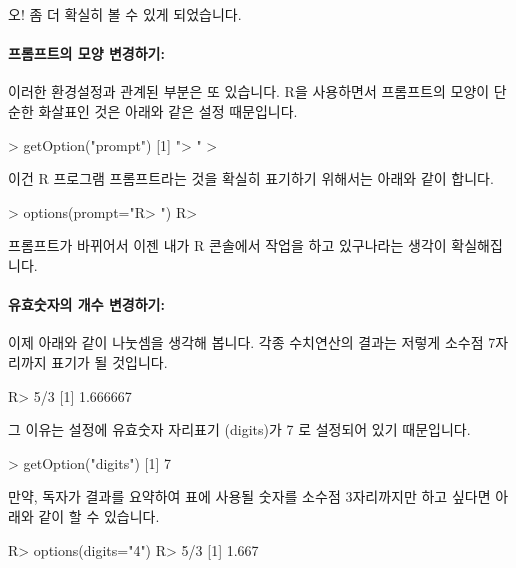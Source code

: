 오! 좀 더 확실히 볼 수 있게 되었습니다. 

\paragraph{프롬프트의 모양 변경하기:}  이러한 환경설정과 관계된 부분은 또 있습니다. 
R을 사용하면서 프롬프트의 모양이 단순한 화살표인 것은 아래와 같은 설정 때문입니다.

\begin{Schunk}
\begin{Soutput}
> getOption("prompt")
[1] "> "
> 
\end{Soutput}
\end{Schunk}

이건 R 프로그램 프롬프트라는 것을 확실히 표기하기 위해서는 아래와 같이 합니다. 

\begin{Schunk}
\begin{Soutput}
> options(prompt="R> ")
R> 
\end{Soutput}
\end{Schunk}

프롬프트가 바뀌어서 이젠 내가 R 콘솔에서 작업을 하고 있구나라는 생각이 확실해집니다.

\paragraph{유효숫자의 개수 변경하기: } 이제 아래와 같이 나눗셈을 생각해 봅니다. 
각종 수치연산의 결과는 저렇게 소수점 7자리까지 표기가 될 것입니다. 

\begin{Schunk}
\begin{Soutput}
R> 5/3
[1] 1.666667
\end{Soutput}
\end{Schunk}

그 이유는 설정에 유효숫자 자리표기 (digits)가 7 로 설정되어 있기 때문입니다. 

\begin{Schunk}
\begin{Soutput}
> getOption("digits")
[1] 7
\end{Soutput}
\end{Schunk}

만약, 독자가 결과를 요약하여 표에 사용될 숫자를 소수점 3자리까지만 하고 싶다면 아래와 같이 할 수 있습니다. 

\begin{Schunk}
\begin{Soutput}
R> options(digits="4")
R> 5/3
[1] 1.667
\end{Soutput}
\end{Schunk}

